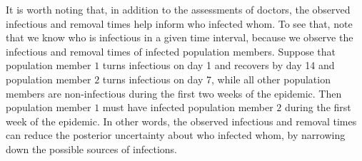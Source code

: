 It is worth noting that,
in addition to the assessments of doctors,
the observed infectious and removal times help inform who infected whom.
To see that,
note that we know who is infectious in a given time interval,
because we observe the infectious and removal times of infected population members.
Suppose that population member $1$ turns infectious on day 1 and recovers by day 14 and population member $2$ turns infectious on day 7,
while all other population members are non-infectious during the first two weeks of the epidemic.
Then population member $1$ must have infected population member $2$ during the first week of the epidemic.
In other words,
the observed infectious and removal times can reduce the posterior uncertainty about who infected whom,
by narrowing down the possible sources of infections.
